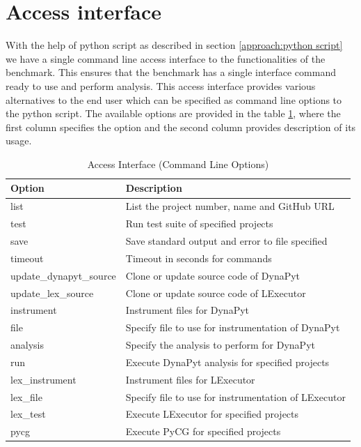 \section{Access interface}
\label{approach:access interface}
With the help of python script as described in section \ref{approach:python script} we have a single command line access interface to the functionalities of the benchmark. This ensures that the benchmark has a single interface command ready to use and perform analysis. This access interface provides various alternatives to the end user which can be specified as command line options to the python script. The available options are provided in the table \ref{table:access interface options}, where the first column specifies the option and the second column provides description of its usage.

\begin{table}[ht]
    \centering
    \begin{tabular}{ll}
    \hline
    \textbf{Option} & \textbf{Description}\\
    \hline
    list    & List the project number, name and GitHub URL\\
    test    & Run test suite of specified projects\\
    save    & Save standard output and error to file specified\\
    timeout & Timeout in seconds for commands\\
    update\_dynapyt\_source   & Clone or update source code of DynaPyt\\
    update\_lex\_source   & Clone or update source code of LExecutor\\
    instrument  & Instrument files for DynaPyt\\
    file    & Specify file to use for instrumentation of DynaPyt\\
    analysis    & Specify the analysis to perform for DynaPyt\\
    run & Execute DynaPyt analysis for specified projects\\
    lex\_instrument  & Instrument files for LExecutor\\
    lex\_file    & Specify file to use for instrumentation of LExecutor\\
    lex\_test    & Execute LExecutor for specified projects\\
    pycg    & Execute PyCG for specified projects\\
    \hline
    \end{tabular}
    \caption{Access Interface (Command Line Options)}
    \label{table:access interface options}
\end{table}

